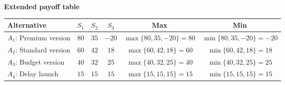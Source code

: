 	\setlength{\columnseprule}{0pt}
	
	\textbf{Extended payoff table}
	
	\begin{center}
		\scriptsize
		\renewcommand{\arraystretch}{1.5}
		\setlength{\tabcolsep}{3pt}
		
		\begin{tabular}{lccccc}
			\toprule
			Alternative & $S_1$ & $S_2$ & $S_3$ & Max & Min \\
			\midrule
			
			$A_1$: Premium version
			& $80$ & $35$ & $-20$
			& $\max\{80,35,-20\}=80$
			& $\min\{80,35,-20\}=-20$
			\\
			
			$A_2$: Standard version
			& $60$ & $42$ & $18$
			& $\max\{60,42,18\}=60$
			& $\min\{60,42,18\}=18$
			\\
			
			$A_3$: Budget version
			& $40$ & $32$ & $25$
			& $\max\{40,32,25\}=40$
			& $\min\{40,32,25\}=25$
			\\
			
			$A_4$: Delay launch
			& $15$ & $15$ & $15$
			& $\max\{15,15,15\}=15$
			& $\min\{15,15,15\}=15$
			\\
			
			\bottomrule
		\end{tabular}
	\end{center}
	
	
	

